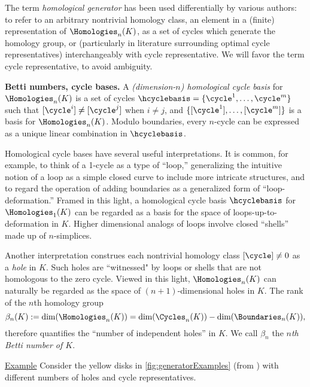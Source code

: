 \begin{remark}
The term \emph{homological generator} has been used differentially by various authors: to refer to an arbitrary nontrivial homology class, an element in a (finite) representation of $\Homologies_n(K)$, as a set of cycles which generate the homology group, or (particularly in literature surrounding optimal cycle representatives)  interchangeably with cycle representative. We will  favor the term cycle representative, to avoid ambiguity.
\end{remark}




\noindent \textbf{Betti numbers, cycle bases.}  A \emph{(dimension-$n$) homological cycle basis} for $\Homologies_n(K)$ is a set of cycles $\hcyclebasis = \{ \cycle^1 , \ldots, \cycle^m\}$ such that $[\cycle^i] \neq [\cycle^j]$ when $i \neq j$, and $\{ [\cycle^1] , \ldots, [\cycle^m]\}$ is a  basis for $\Homologies_n(K)$.  Modulo boundaries, every $n$-cycle can be expressed as a unique linear combination in $\hcyclebasis$.  

Homological cycle bases have several useful interpretations.  It is common, for example, to think of a 1-cycle as a type of ``loop,'' generalizing the intuitive notion of a loop as a simple closed curve to include more intricate structures, and to regard the operation of adding boundaries as a generalized form of ``loop-deformation.''  Framed in this light, a homological cycle basis $\hcyclebasis$ for $\Homologies_1(K)$ can be regarded as a basis for the space of loops-up-to-deformation in $K$. Higher dimensional analogs of loops involve closed ``shells'' made up of $n$-simplices.

Another interpretation construes each nontrivial homology class $[\cycle] \neq 0$ as a \emph{hole} in $K$. Such holes are ``witnessed" by loops or shells that are not homologous to the zero cycle. Viewed in this light, $\Homologies_n(K)$ can naturally be regarded as the space of $(n+1)$-dimensional holes in $K$.  The rank of the $n$th homology group
    \[
    \beta_n(K) := \text{dim}(\Homologies_n(K)) = \text{dim}(\Cycles_n(K)) - \text{dim}(\Boundaries_n(K)),
    \]
therefore quantifies the ``number of independent holes'' in $K$.  We call $\beta_n$ the \emph{$n$th Betti number of $K$}.  

\noindent \underline{Example} Consider the yellow disks in \fig \ref{fig:generatorExamples} (from  \cite{Carlsson2009TopologyAD}) with different numbers of holes and cycle representatives. 


